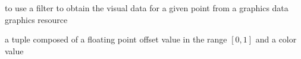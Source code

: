to use a filter to obtain the visual data for a given point from a graphics data graphics resource

a tuple composed of a floating point offset value in the range $[0, 1]$ and a color value



%
%

%
%
%
